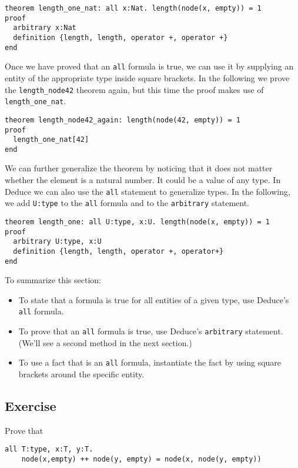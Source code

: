 \documentclass[12pt]{article}
\begin{document}
\begin{verbatim}
theorem length_one_nat: all x:Nat. length(node(x, empty)) = 1
proof
  arbitrary x:Nat
  definition {length, length, operator +, operator +}
end
\end{verbatim}

Once we have proved that an \texttt{all} formula is true, we can use it by
supplying an entity of the appropriate type inside square brackets. In
the following we prove the \texttt{length\_node42} theorem again, but this
time the proof makes use of \texttt{length\_one\_nat}.

\begin{verbatim}
theorem length_node42_again: length(node(42, empty)) = 1
proof
  length_one_nat[42]
end
\end{verbatim}

We can further generalize the theorem by noticing that it does not
matter whether the element is a natural number. It could be a value of
any type. In Deduce we can also use the \texttt{all} statement to
generalize types. In the following, we add \texttt{U:type} to the
\texttt{all} formula and to the \texttt{arbitrary} statement.

\begin{verbatim}
theorem length_one: all U:type, x:U. length(node(x, empty)) = 1
proof
  arbitrary U:type, x:U
  definition {length, length, operator +, operator+}
end
\end{verbatim}

To summarize this section:
\begin{itemize}
\item To state that a formula is true for all entities of a given
  type, use Deduce's \texttt{all} formula.
\item To prove that an \texttt{all} formula is true, use Deduce's
  \texttt{arbitrary} statement.  (We'll see a second method in the
  next section.)
\item To use a fact that is an \texttt{all} formula, instantiate the
  fact by using square brackets around the specific entity.
\end{itemize}

\subsection*{Exercise}

Prove that
\begin{verbatim}
all T:type, x:T, y:T. 
    node(x,empty) ++ node(y, empty) = node(x, node(y, empty))
\end{verbatim}
\end{document}
